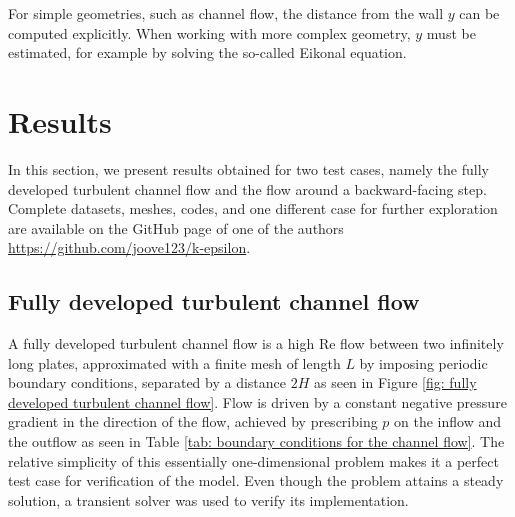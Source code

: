 For simple geometries, such as channel flow, the distance from the wall \(y\) can be computed explicitly. When working with more complex geometry, \(y\) must be estimated, for example by solving the so-called Eikonal equation.

\section{Results}

In this section, we present results obtained for two test cases, namely the fully developed turbulent channel flow and the flow around a backward-facing step. Complete datasets, meshes, codes, and one different case for further exploration are available on the GitHub page of one of the authors \href{https://github.com/joove123/k-epsilon}{https://github.com/joove123/k-epsilon}.

\subsection{Fully developed turbulent channel flow}

A fully developed turbulent channel flow is a high \(\text{Re}\) flow between two infinitely long plates, approximated with a finite mesh of length \(L\) by imposing periodic boundary conditions, separated by a distance \(2H\) as seen in Figure \ref{fig: fully developed turbulent channel flow}. Flow is driven by a constant negative pressure gradient in the direction of the flow, achieved by prescribing \(p\) on the inflow and the outflow as seen in Table \ref{tab: boundary conditions for the channel flow}. The relative simplicity of this essentially one-dimensional problem makes it a perfect test case for verification of the model. Even though the problem attains a steady solution, a transient solver was used to verify its implementation.

